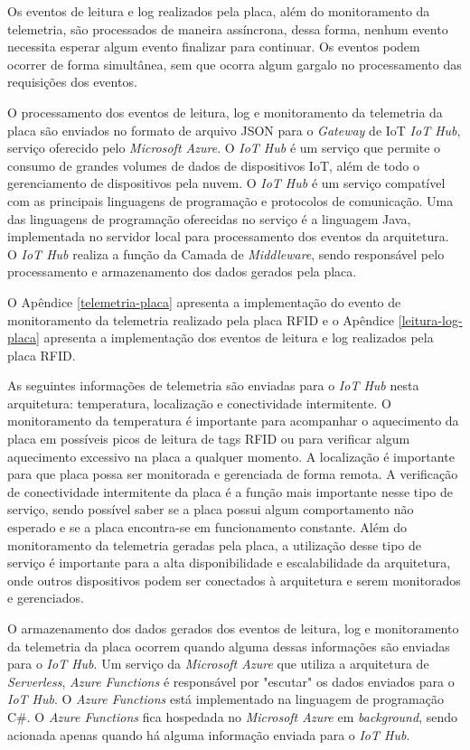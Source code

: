 Os eventos de leitura e log realizados pela placa, além do monitoramento da telemetria, são processados de maneira assíncrona, dessa forma, nenhum evento necessita esperar algum evento finalizar para continuar. Os eventos podem ocorrer de forma simultânea, sem que ocorra algum gargalo no processamento das requisições dos eventos.

O processamento dos eventos de leitura, log e monitoramento da telemetria da placa são enviados no formato de arquivo \acrfull{JSON} para o \textit{Gateway} de \acrshort{IoT} \textit{IoT Hub}, serviço oferecido pelo \textit{Microsoft Azure}. O \textit{IoT Hub} é um serviço que permite o consumo de grandes volumes de dados de dispositivos \acrshort{IoT}, além de todo o gerenciamento de dispositivos pela nuvem. O \textit{IoT Hub} é um serviço compatível com as principais linguagens de programação e protocolos de comunicação. Uma das linguagens de programação oferecidas no serviço é a linguagem Java, implementada no servidor local para processamento dos eventos da arquitetura. O \textit{IoT Hub} realiza a função da Camada de \textit{Middleware}, sendo responsável pelo processamento e armazenamento dos dados gerados pela placa.

O Apêndice \ref{telemetria-placa} apresenta a implementação do evento de monitoramento da telemetria realizado pela placa \acrshort{RFID} e o Apêndice \ref{leitura-log-placa} apresenta a implementação dos eventos de leitura e log realizados pela placa \acrshort{RFID}.

As seguintes informações de telemetria são enviadas para o \textit{IoT Hub} nesta arquitetura: temperatura, localização e conectividade intermitente. O monitoramento da temperatura é importante para acompanhar o aquecimento da placa em possíveis picos de leitura de tags \acrshort{RFID} ou para verificar algum aquecimento excessivo na placa a qualquer momento. A localização é importante para que placa possa ser monitorada e gerenciada de forma remota. A verificação de conectividade intermitente da placa é a função mais importante nesse tipo de serviço, sendo possível saber se a placa possui algum comportamento não esperado e se a placa encontra-se em funcionamento constante. Além do monitoramento da telemetria geradas pela placa, a utilização desse tipo de serviço é importante para a alta disponibilidade e escalabilidade da arquitetura, onde outros dispositivos podem ser conectados à arquitetura e serem monitorados e gerenciados.

O armazenamento dos dados gerados dos eventos de leitura, log e monitoramento da telemetria da placa ocorrem quando alguma dessas informações são enviadas para o \textit{IoT Hub}. Um serviço da \textit{Microsoft Azure} que utiliza a arquitetura de \textit{Serverless}, \textit{Azure Functions} é responsável por "escutar" os dados enviados para o \textit{IoT Hub}. O \textit{Azure Functions} está implementado na linguagem de programação C\#. O \textit{Azure Functions} fica hospedada no \textit{Microsoft Azure} em \textit{background}, sendo acionada apenas quando há alguma informação enviada para o \textit{IoT Hub}.

